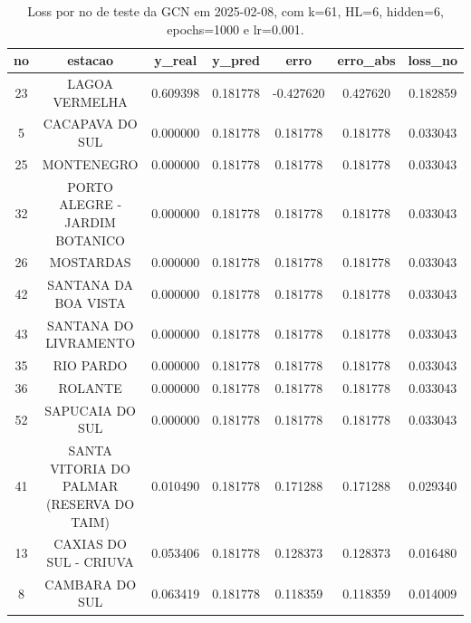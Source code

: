 \begin{table}[h]
\centering
\caption{Loss por no de teste da GCN em 2025-02-08, com k=61, HL=6, hidden=6, epochs=1000 e lr=0.001.}
\label{tab:gcn_loss_k61_hl6_h6_e1000_d20250208}
\begin{tabular}{ccccccc}
\toprule
no & estacao & y\_real & y\_pred & erro & erro\_abs & loss\_no \\
\midrule
23 & LAGOA VERMELHA & 0.609398 & 0.181778 & -0.427620 & 0.427620 & 0.182859 \\
5 & CACAPAVA DO SUL & 0.000000 & 0.181778 & 0.181778 & 0.181778 & 0.033043 \\
25 & MONTENEGRO & 0.000000 & 0.181778 & 0.181778 & 0.181778 & 0.033043 \\
32 & PORTO ALEGRE - JARDIM BOTANICO & 0.000000 & 0.181778 & 0.181778 & 0.181778 & 0.033043 \\
26 & MOSTARDAS & 0.000000 & 0.181778 & 0.181778 & 0.181778 & 0.033043 \\
42 & SANTANA DA BOA VISTA & 0.000000 & 0.181778 & 0.181778 & 0.181778 & 0.033043 \\
43 & SANTANA DO LIVRAMENTO & 0.000000 & 0.181778 & 0.181778 & 0.181778 & 0.033043 \\
35 & RIO PARDO & 0.000000 & 0.181778 & 0.181778 & 0.181778 & 0.033043 \\
36 & ROLANTE & 0.000000 & 0.181778 & 0.181778 & 0.181778 & 0.033043 \\
52 & SAPUCAIA DO SUL & 0.000000 & 0.181778 & 0.181778 & 0.181778 & 0.033043 \\
41 & SANTA VITORIA DO PALMAR (RESERVA DO TAIM) & 0.010490 & 0.181778 & 0.171288 & 0.171288 & 0.029340 \\
13 & CAXIAS DO SUL - CRIUVA & 0.053406 & 0.181778 & 0.128373 & 0.128373 & 0.016480 \\
8 & CAMBARA DO SUL & 0.063419 & 0.181778 & 0.118359 & 0.118359 & 0.014009 \\
\bottomrule
\end{tabular}
\end{table}
